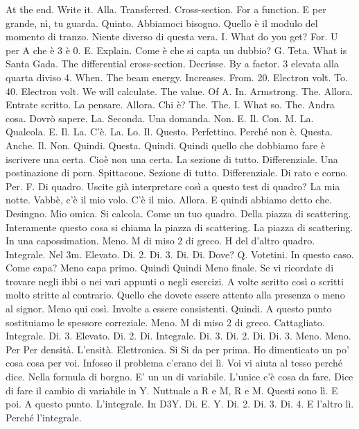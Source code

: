 \begin{soluzione}
   At the end. Write it. Alla. Transferred. Cross-section. For a function. E per grande, nì, tu guarda. Quinto. Abbiamoci bisogno. Quello è il modulo del momento di tranzo. Niente diverso di questa vera. I. What do you get? For. U per A che è 3 è 0. E. Explain. Come è che si capta un dubbio? G. Teta. What is Santa Gada. The differential cross-section. Decrisse. By a factor. 3 elevata alla quarta diviso 4. When. The beam energy. Increases. From. 20. Electron volt. To. 40. Electron volt. We will calculate. The value. Of A. In. Armstrong. The. Allora. Entrate scritto. La pensare. Allora. Chi è? The. The. I. What so. The. Andra cosa. Dovrò sapere. La. Seconda. Una domanda. Non. E. Il. Con. M. La. Qualcola. E. Il. La. C'è. La. Lo. Il. Questo. Perfettino. Perché non è. Questa. Anche. Il. Non. Quindi. Questa. Quindi. Quindi quello che dobbiamo fare è iscrivere una certa. Cioè non una certa. La sezione di tutto. Differenziale. Una postinazione di porn. Spittacone. Sezione di tutto. Differenziale. Di rato e corno. Per. F. Di quadro. Uscite già interpretare così a questo test di quadro? La mia notte. Vabbè, c'è il mio volo. C'è il mio. Allora. E quindi abbiamo detto che. Desingno. Mio omica. Si calcola. Come un tuo quadro. Della piazza di scattering. Interamente questo cosa si chiama la piazza di scattering. La piazza di scattering. In una capossimation. Meno. M di miso 2 di greco. H del d'altro quadro. Integrale. Nel 3m. Elevato. Di. 2. Di. 3. Di. Di. Dove? Q. Votetini. In questo caso. Come capa? Meno capa primo. Quindi Quindi Meno finale. Se vi ricordate di trovare negli ibbi o nei vari appunti o negli esercizi. A volte scritto così o scritti molto stritte al contrario. Quello che dovete essere attento alla presenza o meno al signor. Meno qui così. Involte a essere consistenti. Quindi. A questo punto sostituiamo le spessore correziale. Meno. M di miso 2 di greco. Cattagliato. Integrale. Di. 3. Elevato. Di. 2. Di. Integrale. Di. 3. Di. 2. Di. Di. 3. Meno. Meno. Per Per densità. L'ensità. Elettronica. Si Si da per prima. Ho dimenticato un po' cosa cosa per voi. Infosso il problema c'erano dei lì. Voi vi aiuta al tesso perché dice. Nella formula di borgno. E' un un di variabile. L'unice c'è cosa da fare. Dice di fare il cambio di variabile in Y. Nuttuale a R e M, R e M. Questi sono lì. E poi. A questo punto. L'integrale. In D3Y. Di. E. Y. Di. 2. Di. 3. Di. 4. E l'altro lì. Perché l'integrale. 
   

\end{soluzione}
